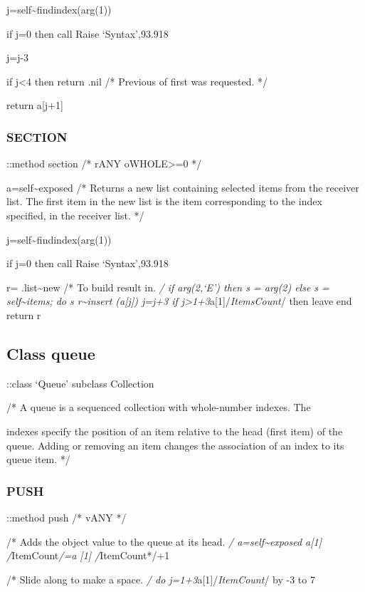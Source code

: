 j=self\textasciitilde findindex(arg(1))

if j=0 then call Raise `Syntax',93.918

j=j-3

if j\textless4 then return .nil /* Previous of first was requested. */

return a{[}j+1{]}

\subsubsection{SECTION}\label{section-2}

::method section /* rANY oWHOLE\textgreater=0 */

a=self\textasciitilde exposed /* Returns a new list containing selected
items from the receiver list. The first item in the new list is the item
corresponding to the index specified, in the receiver list. */

j=self\textasciitilde findindex(arg(1))

if j=0 then call Raise `Syntax',93.918

r= .list\textasciitilde new /* To build result in. \emph{/ if arg(2,`E')
then s = arg(2) else s = self\textasciitilde items; do s
r\textasciitilde insert (a{[}j{]}) j=j+3 if
j\textgreater1+3}a{[}1{]}/\emph{ItemsCount}/ then leave end return r

\subsection{Class queue}\label{class-queue}

::class `Queue' subclass Collection

/* A queue is a sequenced collection with whole-number indexes. The

indexes specify the position of an item relative to the head (first
item) of the queue. Adding or removing an item changes the association
of an index to its queue item. */

\subsubsection{PUSH}\label{push}

::method push /* vANY */

/* Adds the object value to the queue at its head. \emph{/
a=self\textasciitilde exposed a{[}1{]} /}ItemCount\emph{/=a {[}1{]}
/}ItemCount*/+1

/* Slide along to make a space. \emph{/ do
j=1+3}a{[}1{]}/\emph{ItemCount}/ by -3 to 7

